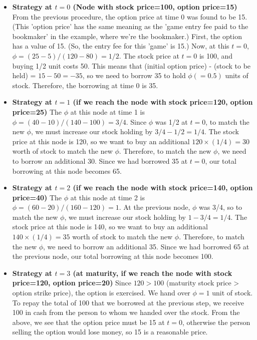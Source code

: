 \documentclass[uplatex,a4j,12pt,dvipdfmx]{jsarticle}
\begin{document}
\begin{itemize}
	\item \textbf{Strategy at $t=0$ (Node with stock price=100, option price=15)}
	From the previous procedure, the option price at time 0 was found to be 15. (This 'option price' has the same meaning as the 'game entry fee paid to the bookmaker' in the example, where we're the bookmaker.) First, the option has a value of 15. (So, the entry fee for this 'game' is 15.) Now, at this $t=0$, $\phi = (25-5)/(120-80) = 1/2$. The stock price at $t=0$ is 100, and buying 1/2 unit costs 50. This means that (initial option price) - (stock to be held) = $15 - 50 = -35$, so we need to borrow 35 to hold $\phi(=0.5)$ units of stock. Therefore, the borrowing at time 0 is 35.

	\item \textbf{Strategy at $t=1$ (if we reach the node with stock price=120, option price=25)}
	The $\phi$ at this node at time 1 is $\phi = (40-10)/(140-100) = 3/4$. Since $\phi$ was 1/2 at $t=0$, to match the new $\phi$, we must increase our stock holding by $3/4 - 1/2 = 1/4$. The stock price at this node is 120, so we want to buy an additional $120 \times (1/4) = 30$ worth of stock to match the new $\phi$. Therefore, to match the new $\phi$, we need to borrow an additional 30. Since we had borrowed 35 at $t=0$, our total borrowing at this node becomes 65.

	\item \textbf{Strategy at $t=2$ (if we reach the node with stock price=140, option price=40)}
	The $\phi$ at this node at time 2 is $\phi = (60-20)/(160-120) = 1$. At the previous node, $\phi$ was 3/4, so to match the new $\phi$, we must increase our stock holding by $1-3/4=1/4$. The stock price at this node is 140, so we want to buy an additional $140 \times (1/4) = 35$ worth of stock to match the new $\phi$. Therefore, to match the new $\phi$, we need to borrow an additional 35. Since we had borrowed 65 at the previous node, our total borrowing at this node becomes 100.

	\item \textbf{Strategy at $t=3$ (at maturity, if we reach the node with stock price=120, option price=20)}
	Since $120 > 100$ (maturity stock price > option strike price), the option is exercised. We hand over $\phi=1$ unit of stock. To repay the total of 100 that we borrowed at the previous step, we receive 100 in cash from the person to whom we handed over the stock. From the above, we see that the option price must be 15 at $t=0$, otherwise the person selling the option would lose money, so 15 is a reasonable price.
\end{itemize}
\end{document}
